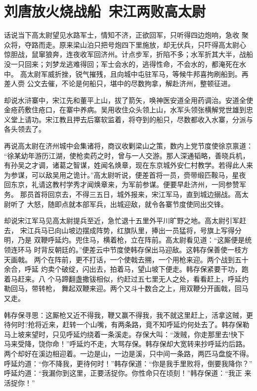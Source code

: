 \chapter{刘唐放火烧战船~宋江两败高太尉}

话说当下高太尉望见水路军士，情知不济，正欲回军，只听得四边炮响，急收
聚众将，夺路而走。原来梁山泊只把号炮四下里施放，却无伏兵，只吓得高太尉心
惊胆战，鼠窜狼奔，连夜收军回济州。计点步军，折陷不多；水军折其大半，战船
没一只回来；刘梦龙逃难得回；军士会水的，逃得性命，不会水的，都淹死在水中。
高太尉军威折挫，锐气摧残，且向城中屯驻军马，等候牛邦喜拘刷船到。再差人赍
公文去催，不论是何船只，堪中的尽数拘拿，解赴济州，整顿征进。

却说水浒寨中，宋江先和董平上山，拔了箭矢，唤神医安道全用药调治。安道全使
金疮药敷住疮口，在寨中养病。吴用收住众头领上山，水军头领张横解党世雄到忠
义堂上请功。宋江教且押去后寨软监着，将夺到的船只，尽数都收入水寨，分派与
各头领去了。

再说高太尉在济州城中会集诸将，商议收剿梁山之策，数内上党节度使徐京禀道：
“徐某幼年游历江湖，使枪卖药之时，曾与一人交游。那人深通韬略，善晓兵机，
有孙吴之才调，诸葛之智谋，姓闻名焕章，现在东京城外安仁村教学。若得此人来
为参谋，可以敌吴用之诡计。”高太尉听说，便差首将一员，赍带缎匹鞍马，星夜
回东京，礼请这教村学秀才闻焕章来，为军前参谋。便要早赴济州，一同参赞军务。
那员首将回京去，不得三五日，城外报来，宋江军马，直到城边搦战。高太尉听了
大怒，随即点就本部军兵，出城迎敌，就令各寨节度使同出交锋。

却说宋江军马见高太尉提兵至近，急忙退十五里外平川旷野之地。高太尉引军赶去，
宋江兵马已向山坡边摆成阵势，红旗队里，捧出一员猛将，号旗上写得分明，乃是
双鞭呼延灼。兜住马，横着枪，立在阵前。高太尉看见道：“这厮便是统领连环马
时背反朝廷的。”便差云中节度使韩存保出马迎敌。这韩存保善使一枝方天画戟。
两个在阵前，更不打话，一个使戟去搠，一个用枪来迎。两个战到五十余合，呼延
灼卖个破绽，闪出去，拍着马，望山坡下便走。韩存保紧要干功，跑着马赶来。八
个马蹄翻盏撒钹相似，约赶过五七里无人之处，看看赶上，呼延灼勒回马，带转枪，
舞起双鞭来迎。两个又斗十数合之上，用双鞭分开画戟，回马又走。

韩存保寻思：这厮枪又近不得我，鞭又赢不得我，我不就这里赶上，活拿这贼，更
待何时?抢将近来，赶转一个山嘴，有两条路，竟不知呼延灼何处去了。韩存保勒
马上坡来望时，只见呼延灼绕着一条溪走。存保大叫：“泼贼，你走那里去!快下
马来受降，饶你命！”呼延灼不走，大骂存保。韩存保却大宽转来抄呼延灼后路。
两个却好在溪边相迎着。一边是山，一边是溪，只中间一条路，两匹马盘旋不得。
呼延灼道：“你不降我，更待何时！”韩存保道：“你是我手里败将，倒要我降你？”
呼延灼道：“我漏你到这里，正要活捉你。你性命只在顷刻！”韩存保道：“我正
来活捉你！”


